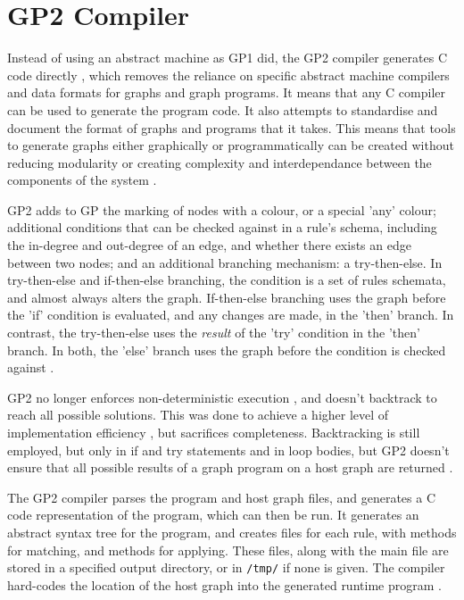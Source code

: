 \documentclass{UoYCSproject}
\begin{document}
\section{GP2 Compiler}
Instead of using an abstract machine as GP1 did, the GP2 compiler generates C code directly \cite{chris_compiler}, which removes the reliance on specific abstract machine compilers and data formats for graphs and graph programs. It means that any C compiler can be used to generate the program code. It also attempts to standardise and document the format of graphs and programs that it takes. This means that tools to generate graphs either graphically or programmatically can be created without reducing modularity or creating complexity and interdependance between the components of the system \cite{gp2_ide}.

GP2 adds to GP the marking of nodes with a colour, or a special 'any' colour; additional conditions that can be checked against in a rule's schema, including the in-degree and out-degree of an edge, and whether there exists an edge between two nodes; and an additional branching mechanism: a try-then-else. In try-then-else and if-then-else branching, the condition is a set of rules schemata, and almost always alters the graph. If-then-else branching uses the graph before the 'if' condition is evaluated, and any changes are made, in the 'then' branch. In contrast, the try-then-else uses the \emph{result} of the 'try' condition in the 'then' branch. In both, the 'else' branch uses the graph before the condition is checked against \cite{gp2_design}.

GP2 no longer enforces non-deterministic execution \cite[p. 15]{gp2_ide}, and doesn't backtrack to reach all possible solutions. This was done to achieve a higher level of implementation efficiency \cite[p. 15]{chris_compiler}, but sacrifices completeness. Backtracking is still employed, but only in if and try statements and in loop bodies, but GP2 doesn't ensure that all possible results of a graph program on a host graph are returned \cite[p. 65]{chris_compiler}.

The GP2 compiler parses the program and host graph files, and generates a C code representation of the program, which can then be run. It generates an abstract syntax tree for the program, and creates files for each rule, with methods for matching, and methods for applying. These files, along with the main file are stored in a specified output directory, or in \texttt{/tmp/} if none is given. The compiler hard-codes the location of the host graph into the generated runtime program \citep{chris_compiler, compiling_gp2}.
\end{document}
